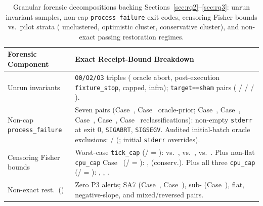 \documentclass[11pt]{article}
\newcommand{\CaseRef}[1]{Case~#1}
\begin{document}
\begin{table}[!ht]
\caption{Granular forensic decompositions backing Sections~\ref{sec:rq2}--\ref{sec:rq3}: unrun invariant samples, non-cap \texttt{process\_failure} exit codes, censoring Fisher bounds vs.\ pilot strata (\BenchPilotAlertPct{} unclustered, \BenchPilotFitClustersFrac{} optimistic cluster, \BenchPilotConservFrac{} conservative cluster), and non-exact passing restoration regimes.}
\label{tab:appendix-forensics}
\centering
\scriptsize
\renewcommand{\arraystretch}{0.88}
\setlength{\tabcolsep}{4pt}
\begin{tabularx}{\linewidth}{@{}lX@{}}
\toprule
Forensic Component & Exact Receipt-Bound Breakdown \\
\midrule
Unrun invariants & \BenchOZeroMiss{} \texttt{O0/O2/O3} triples (\BenchOZeroOracleAbort{} oracle abort, \BenchOZeroOverlayFix{} post-execution \texttt{fixture\_stop}, \BenchOZeroCapped{} capped, \BenchOZeroInfraMiss{} infra); \BenchShamMiss{} \texttt{target==sham} pairs (\BenchShamOracleAbort{} / \BenchShamOverlayFix{} / \BenchShamCapped{} / \BenchShamInfraMiss{}). \\
\addlinespace[1.5pt]
Non-cap \texttt{process\_failure} & Seven pairs (\CaseRef{\BenchPosTwoSeven{}}, \CaseRef{\BenchPosTwoNine{}} oracle-prior; \CaseRef{\BenchPosSevenOne{}}, \CaseRef{\BenchPosOneZeroSeven{}}, \CaseRef{\BenchPosOneOneSix{}}, \CaseRef{\BenchPosOneFourOne{}}, \CaseRef{\BenchPosOneSixSeven{}} reclassifications): \BenchPfStderrN{} non-empty \texttt{stderr} at exit 0, \BenchPfSigabrtN{} \texttt{SIGABRT}, \BenchPfSigsegvN{} \texttt{SIGSEGV}. Audited initial-batch oracle exclusions: \BenchOracleCoordN{}/\BenchOracleFailN{} (\BenchOracleCoordPct{}; \BenchWaveOneOverrideN{} initial \texttt{stderr} overrides). \\
\addlinespace[1.5pt]
Censoring Fisher bounds & Worst-case \texttt{tick\_cap} (\BenchCensorWorstN{}/\BenchCensorDenom{} = \BenchCensorWorstPct{}): \BenchCensorWorstFisherP{} vs.\ \BenchPilotAlertPct{}, \BenchCensorWorstFisherFourTwelveP{} vs.\ \BenchPilotFitClustersFrac{}, \BenchCensorWorstFisherConservP{} vs.\ \BenchPilotConservFrac{}. Plus non-flat \texttt{cpu\_cap} \CaseRef{\BenchPosNineZero{}} (\BenchCensorCpuCapExclFlatN{}/\BenchCensorDenom{} = \BenchCensorCpuCapExclFlatPct{}): \BenchCensorCpuCapExclFlatP{}, \BenchCensorCpuCapExclFlatConservP{} (conserv.). Plus all three \texttt{cpu\_cap} (\BenchCensorCpuCapTotalN{}/\BenchCensorDenom{} = \BenchCensorCpuCapPct{}): \BenchCensorCpuCapFisherP{}, \BenchCensorCpuCapFourTwelveP{}, \BenchCensorCpuCapConservP{}. \\
\addlinespace[1.5pt]
Non-exact rest.\ (\BenchRestNonExactPassN{}) & Zero P3 alerts; \BenchRestNonExSATwoN{} SA7 (\CaseRef{\BenchPosNineZero{}}, \CaseRef{\BenchPosOneTwoNine{}}), \BenchRestNonExSubN{} sub-\BenchMinSlope{} (\CaseRef{\BenchPosNineOne{}}), \BenchRestNonExFlatN{} flat, \BenchRestNonExNegN{} negative-slope, and \BenchRestNonExMixN{} mixed/reversed pairs. \\
\bottomrule
\end{tabularx}
\end{table}
\end{document}
